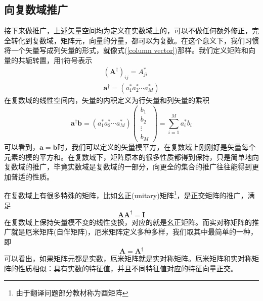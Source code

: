 \documentclass[12pt,a4paper,openany,twoside]{book}
\numberwithin{equation}{section}
\begin{document}
    \subsection{向复数域推广}
    接下来做推广，上述矢量空间均为定义在实数域上的，可以不做任何额外修正，完全转化到复数域，矩阵元，向量的分量，都可以为复数。在这个意义下，我们习惯将一个矢量写成列矢量的形式，就像式(\ref{column vector})那样。我们定义矩阵和向量的共轭转置，用$\dagger$符号表示
    \begin{equation}
      \begin{aligned}
        \left(\mathbf{A}^{\dagger}\right)_{i j}=A_{j i}^{*}\\
        \mathbf{a}^{\dagger}=\left(a_{1}^{*} a_{2}^{*} \cdots a_{{M}}^{*}\right)
      \end{aligned}
    \end{equation}
    在复数域的线性空间内，矢量的内积定义为行矢量和列矢量的乘积
    \begin{equation}
      \mathbf{a}^{\dagger} \mathbf{b}=\left(a_{1}^{*} a_{2}^{*} \cdots a_{{M}}^{*}\right) \left( \begin{array}{c}{b_{1}} \\ {b_{2}} \\ {\vdots} \\ {b_{M}}\end{array}\right)=\sum_{i=1}^{M} a_{i}^{*} b_{i}
      \label{inner product in row and column }
    \end{equation}
    可以看到，$\mathbf{a}=\mathbf{b}$时，我们可以定义的矢量模平方，在复数域上刚刚好是矢量每个元素的模的平方和。在复数域下，矩阵原本的很多性质都得到保持，只是简单地向复数域的推广，毕竟实数域是复数域的一部分，向更全的集合的推广往往能得到更加普适的性质。

    在复数域上有很多特殊的矩阵，比如幺正(unitary)矩阵\footnote{由于翻译问题部分教材称为酉矩阵}，是正交矩阵的推广，满足
    \begin{equation}
      \mathbf{A}\mathbf{A}^{\dagger}=\mathbf{I}
      \label{unitary def}
    \end{equation}
    在复数域上保持矢量模不变的线性变换，对应的就是幺正矩阵。而实对称矩阵的推广就是厄米矩阵(自伴矩阵)，厄米矩阵定义多种多样，我们取其中最简单的一种，即
    \begin{equation}
      \mathbf{A}=\mathbf{A}^{\dagger}
    \end{equation}
    可以看出，如果矩阵元都是实数，厄米矩阵就是实对称矩阵。厄米矩阵和实对称矩阵的性质相似：具有实数的特征值，并且不同特征值对应的特征向量正交。
\end{document}

